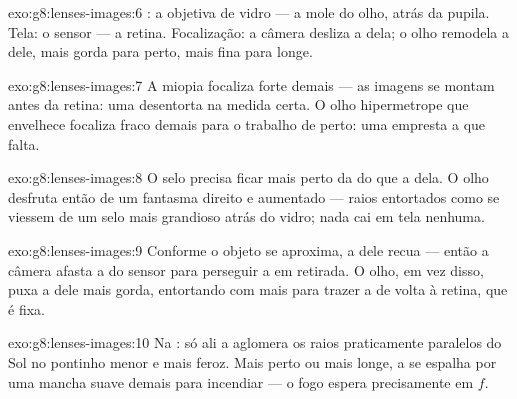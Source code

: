 \begin{solution}{exo:g8:lenses-images:6}
: a objetiva de vidro --- a  mole do olho, atrás da pupila.
Tela: o sensor --- a retina. Focalização: a câmera desliza a 
dela; o olho remodela a  dele, mais gorda para perto, mais fina
para longe.
\end{solution}

\begin{solution}{exo:g8:lenses-images:7}
A miopia focaliza forte demais --- as imagens se montam antes da
retina: uma  desentorta na medida certa. O olho
hipermetrope que envelhece focaliza fraco demais para o trabalho de
perto: uma  empresta a  que falta.
\end{solution}

\begin{solution}{exo:g8:lenses-images:8}
O selo precisa ficar mais perto da  do que a 
dela. O olho desfruta então de um fantasma direito e aumentado ---
raios entortados como se viessem de um selo mais grandioso atrás do
vidro; nada cai em tela nenhuma.
\end{solution}

\begin{solution}{exo:g8:lenses-images:9}
Conforme o objeto se aproxima, a  dele recua --- então a câmera
afasta a  do sensor para perseguir a  em retirada. O olho,
em vez disso, puxa a  dele mais gorda, entortando com mais 
para trazer a  de volta à retina, que é fixa.
\end{solution}

\begin{solution}{exo:g8:lenses-images:10}
Na : só ali a  aglomera os raios praticamente
paralelos do Sol no pontinho menor e mais feroz. Mais perto ou mais
longe, a  se espalha por uma mancha suave demais para incendiar
--- o fogo espera precisamente em $f$.
\end{solution}

